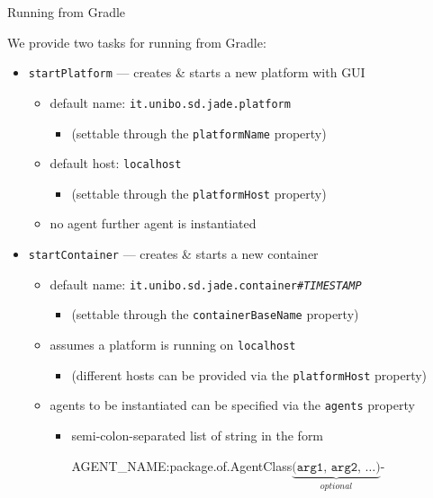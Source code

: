 \documentclass{beamer}\mode<presentation>{\usetheme{AMSCesenaPurpleAndGold}}
\begin{document}
\begin{frame}{Running \jade{} from Gradle}
    
    We provide two tasks for running \jade{} from Gradle:
    \vfill
    \begin{itemize}
    	\item \alert{\texttt{startPlatform}} --- creates \& starts a new platform with GUI
    	\begin{itemize}
    		\item default name: \texttt{it.unibo.sd.jade.platform}
    		\begin{itemize}
				\item (settable through the \texttt{platformName} property)
    		\end{itemize}
    	
    		\item default host: \texttt{localhost}
    		\begin{itemize}
    			\item (settable through the \texttt{platformHost} property)
    		\end{itemize}
    	
    		\item \alert{no agent} further agent is instantiated
    	\end{itemize}
    
    	\vfill
    	
	    \item \alert{\texttt{startContainer}} --- creates \& starts a new container 
	    \begin{itemize}
	    	
	    	\item default name: \texttt{it.unibo.sd.jade.container\#\textit{TIMESTAMP}}
	    	\begin{itemize}
	    		\item (settable through the \texttt{containerBaseName} property)
	    	\end{itemize}
	    	
	    	\item assumes a platform is running on \texttt{localhost}
	    	\begin{itemize}
	    		\item (different hosts can be provided via the \texttt{platformHost} property)
	    	\end{itemize}
    	
    		\item agents to be instantiated can be specified via the \alert{\texttt{agents}} property 
    		\begin{itemize}
    			\item semi-colon-separated list of string in the form
    			\begin{center}\ttfamily
    				AGENT\_NAME\alert{:}package.of.AgentClass$\underbrace{\texttt{(arg1, arg2, \ldots)}}_{optional}$-
    			\end{center}
    		\end{itemize}
	    \end{itemize}
    \end{itemize}
\end{frame}
\end{document}
